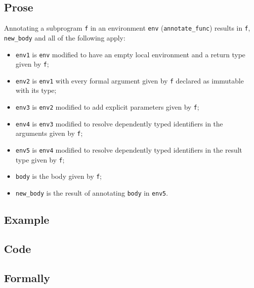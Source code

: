 \documentclass{book}
\begin{document}
  \subsection{Prose}
Annotating a subprogram \texttt{f} in an environment \texttt{env}
(\texttt{annotate\_func}) results in \texttt{f}, \texttt{new\_body} and all of
the following apply:
 \begin{itemize}
   \item \texttt{env1} is \texttt{env} modified to have an empty local
     environment and a return type given by \texttt{f};
   \item \texttt{env2} is \texttt{env1} with every formal argument given by
     \texttt{f} declared as immutable with its type;
   \item \texttt{env3} is \texttt{env2} modified to add explicit parameters
     given by \texttt{f};
   \item \texttt{env4} is \texttt{env3} modified to resolve dependently typed
     identifiers in the arguments given by \texttt{f};
   \item \texttt{env5} is \texttt{env4} modified to resolve dependently typed
     identifiers in the result type given by \texttt{f};
   \item \texttt{body} is the body given by \texttt{f};
   \item \texttt{new\_body} is the result of annotating \texttt{body} in
     \texttt{env5}.
 \end{itemize}

  \subsection{Example}

  \subsection{Code}

\begin{emptyformal}
    \subsection{Formally}
\end{emptyformal}

\end{document}
